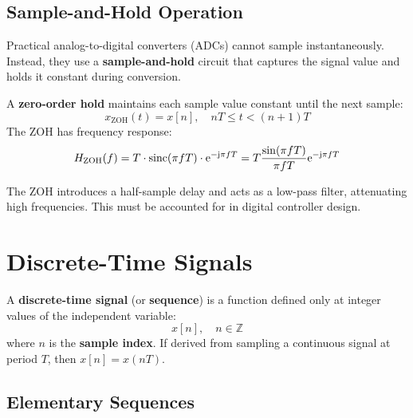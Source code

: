 \subsection{Sample-and-Hold Operation}

Practical analog-to-digital converters (ADCs) cannot sample instantaneously. Instead, they use a \textbf{sample-and-hold} circuit that captures the signal value and holds it constant during conversion.

\begin{definitionbox}[title=Definition: Zero-Order Hold (ZOH)]
A \textbf{zero-order hold} maintains each sample value constant until the next sample:
\begin{equation}
x_{\text{ZOH}}(t) = x[n], \quad nT \leq t < (n+1)T
\end{equation}
The ZOH has frequency response:
\begin{equation}
H_{\text{ZOH}}(f) = T \cdot \operatorname{sinc}(\pi f T) \cdot \mathrm{e}^{-\mathrm{j} \pi f T} = T \frac{\sin(\pi f T)}{\pi f T} \mathrm{e}^{-\mathrm{j} \pi f T}
\end{equation}
\end{definitionbox}

The ZOH introduces a half-sample delay and acts as a low-pass filter, attenuating high frequencies. This must be accounted for in digital controller design.



\section{Discrete-Time Signals}

\begin{definitionbox}[title=Definition: Discrete-Time Signal]
A \textbf{discrete-time signal} (or \textbf{sequence}) is a function defined only at integer values of the independent variable:
\begin{equation}
x[n], \quad n \in \mathbb{Z}
\end{equation}
where $n$ is the \textbf{sample index}. If derived from sampling a continuous signal at period $T$, then $x[n] = x(nT)$.
\end{definitionbox}

\subsection{Elementary Sequences}

